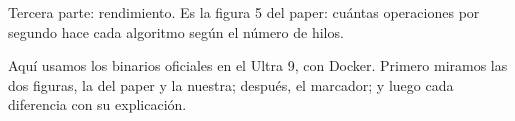 Tercera parte: rendimiento. Es la figura 5 del paper: cuántas operaciones por segundo hace cada algoritmo según el número de hilos.

Aquí usamos los binarios oficiales en el Ultra 9, con Docker. Primero miramos las dos figuras, la del paper y la nuestra; después, el marcador; y luego cada diferencia con su explicación.
